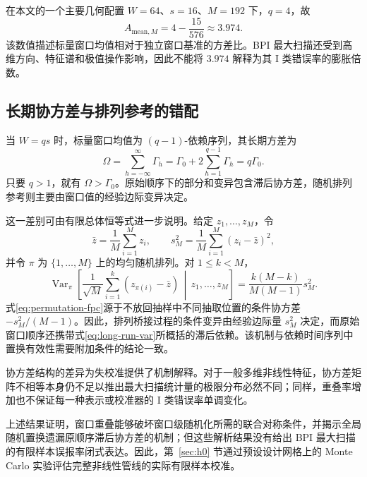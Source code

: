 在本文的一个主要几何配置 $W=64$、$s=16$、$M=192$ 下，$q=4$，故
\[
 A_{\mathrm{mean},M}=4-\frac{15}{576}\approx3.974.
\]
该数值描述标量窗口均值相对于独立窗口基准的方差比。BPI 最大扫描还受到高维方向、特征谱和极值操作影响，因此不能将 $3.974$ 解释为其 I 类错误率的膨胀倍数。

\subsection{长期协方差与排列参考的错配}\label{sec:t4}

当 $W=qs$ 时，标量窗口均值为 $(q-1)$-依赖序列，其长期方差为
\begin{equation}\label{eq:long-run-var}
 \Omega
 =\sum_{h=-\infty}^{\infty}\Gamma_h
 =\Gamma_0+2\sum_{h=1}^{q-1}\Gamma_h
 =q\Gamma_0.
\end{equation}
只要 $q>1$，就有 $\Omega>\Gamma_0$。原始顺序下的部分和变异包含滞后协方差，随机排列参考则主要由窗口值的经验边际变异决定。

这一差别可由有限总体恒等式进一步说明。给定 $z_1,\ldots,z_M$，令
\[
 \bar z=\frac1M\sum_{i=1}^M z_i,
 \qquad
 s_M^2=\frac1M\sum_{i=1}^M(z_i-\bar z)^2,
\]
并令 $\pi$ 为 $\{1,\ldots,M\}$ 上的均匀随机排列。对 $1\le k<M$，
\begin{equation}\label{eq:permutation-fpc}
 \operatorname{Var}_{\pi}\left[
 \frac1{\sqrt M}\sum_{i=1}^k(z_{\pi(i)}-\bar z)
 \,\middle|\,z_1,\ldots,z_M\right]
 =\frac{k(M-k)}{M(M-1)}s_M^2.
\end{equation}
式\eqref{eq:permutation-fpc}源于不放回抽样中不同抽取位置的条件协方差 $-s_M^2/(M-1)$。因此，排列桥接过程的条件变异由经验边际量 $s_M^2$ 决定，而原始窗口顺序还携带式\eqref{eq:long-run-var}所概括的滞后依赖。该机制与依赖时间序列中置换有效性需要附加条件的结论一致\cite{RomanoTirlea2022}。

协方差结构的差异为失校准提供了机制解释。对于一般多维非线性特征，协方差矩阵不相等本身仍不足以推出最大扫描统计量的极限分布必然不同；同样，重叠率增加也不保证每一种表示或校准器的 I 类错误率单调变化。

上述结果证明，窗口重叠能够破坏窗口级随机化所需的联合对称条件，并揭示全局随机置换遗漏原顺序滞后协方差的机制；但这些解析结果没有给出 BPI 最大扫描的有限样本误报率闭式表达。因此，第~\ref{sec:h0} 节通过预设设计网格上的 Monte Carlo 实验评估完整非线性管线的实际有限样本校准。
